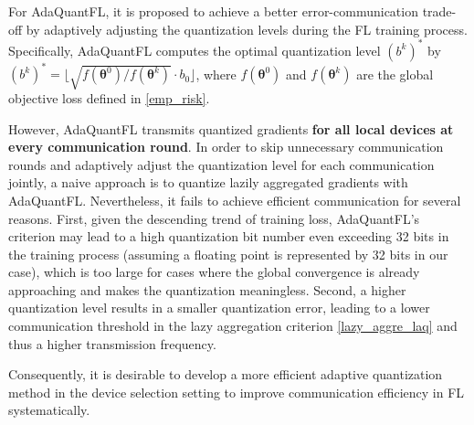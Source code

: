 \documentclass[lettersize,journal]{IEEEtran}
\begin{document}
For AdaQuantFL, it is proposed to achieve a better error-communication trade-off by adaptively adjusting the quantization levels during the FL training process. Specifically, AdaQuantFL computes the optimal quantization level $(b^{k})^{*}$ by $(b^{k})^{*} =\lfloor\sqrt{{f(\boldsymbol{\theta}^{0})}/{f(\boldsymbol{\theta}^{k})}}\cdot b_{0}\rfloor$, where $f(\boldsymbol{\theta}^{0})$ and $f(\boldsymbol{\theta}^{k})$ are the global objective loss defined in \eqref{emp_risk}.

However, AdaQuantFL transmits quantized gradients \textbf{for all local devices at  every communication round}. In order to skip unnecessary communication rounds and adaptively adjust the quantization level for each communication jointly, a naive approach is to quantize lazily aggregated gradients with AdaQuantFL. Nevertheless, it fails to achieve efficient communication for several reasons. First, given the descending trend of training loss, AdaQuantFL's criterion may lead to a high quantization bit number even exceeding 32 bits in the training process (assuming a floating point is represented by 32 bits in our case), which is too large for cases where the global convergence is already approaching and makes the quantization meaningless. Second, a higher quantization level results in a smaller quantization error, leading to a lower communication threshold in the lazy aggregation criterion \eqref{lazy_aggre_laq} and thus a higher transmission frequency.

Consequently, it is desirable to develop a more efficient adaptive quantization method in the device selection setting to improve communication efficiency in FL systematically.
\end{document}
